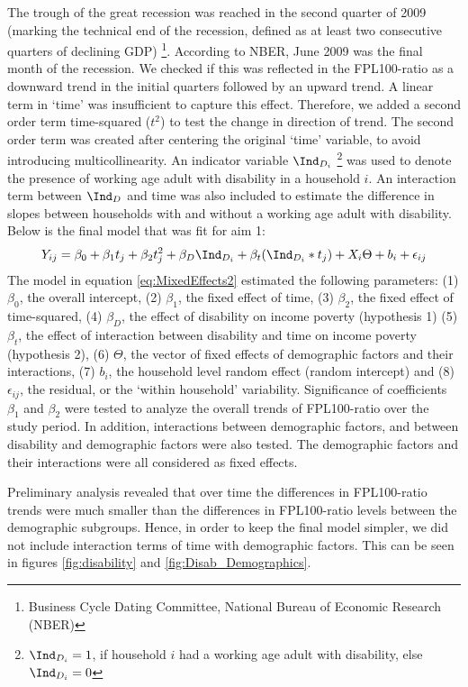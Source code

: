 \documentclass[11pt]{extarticle} %
\begin{document}
The  trough of the great recession was reached in the second quarter of 2009 (marking the technical end of the recession, defined as at least two consecutive quarters of declining GDP) \footnote{Business Cycle Dating Committee, National Bureau of Economic Research (NBER)}. According to NBER, June 2009 was the final month of the recession. We checked if this was reflected in the FPL100-ratio as a downward trend in the initial quarters followed by an upward trend. A linear term in `time' was insufficient to capture this effect. Therefore, we added a second order term time-squared ($t^2$) to test the change in direction of trend. The second order term was created after centering the original `time' variable, to avoid introducing multicollinearity. An indicator variable $\Ind_{D_i}$ \footnote{$\Ind_{D_i} = 1$, if household $i$ had a working age adult with disability, else $\Ind_{D_i} = 0$} was used to denote the presence of working age adult with disability in a household $i$. An interaction term between $\Ind_{D}$ and time was also included to estimate the difference in slopes between households with and without a working age adult with disability. Below is the final model that was fit for aim 1:
\vspace{-0.5cm}
\begin{equation}
Y_{ij} = \beta_0 + \beta_1 t_j + \beta_2 t_j^2 + \beta_D \Ind_{D_i} + \beta_t(\Ind_{D_i}*t_j) + X_i\Theta + b_i + \epsilon_{ij}
\label{eq:MixedEffects2}
\end{equation}
The model in equation \ref{eq:MixedEffects2} estimated the following parameters: (1) $\beta_0$, the overall intercept, (2) $\beta_1$, the fixed effect of time, (3) $\beta_2$, the fixed effect of time-squared, (4) $\beta_D$, the effect of disability on income poverty (hypothesis 1) (5) $\beta_t$, the effect of interaction between disability and time on income poverty (hypothesis 2), (6) $\Theta$, the vector of fixed effects of demographic factors and their interactions, (7) $b_i$, the household level random effect (random intercept) and (8) $\epsilon_{ij}$, the residual, or the `within household' variability. Significance of coefficients $\beta_1$ and $\beta_2$ were tested to analyze the overall trends of FPL100-ratio over the study period. In addition, interactions between demographic factors, and between disability and demographic factors were also tested. The demographic factors and their interactions were all considered as fixed effects.

Preliminary analysis revealed that over time the differences in FPL100-ratio trends were much smaller than the differences in FPL100-ratio levels between the demographic subgroups. Hence, in order to keep the final model simpler, we did not include interaction terms of time with demographic factors. This can be seen in figures \ref{fig:disability} and \ref{fig:Disab_Demographics}. 
\end{document}
